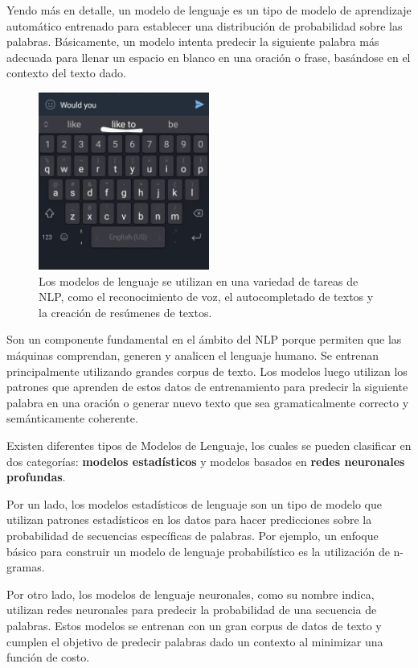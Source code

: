 Yendo más en detalle, un modelo de lenguaje es un tipo de modelo de aprendizaje automático entrenado para establecer una distribución de probabilidad sobre las palabras. Básicamente, un modelo intenta predecir la siguiente palabra más adecuada para llenar un espacio en blanco en una oración o frase, basándose en el contexto del texto dado.

\begin{figure}[H]
    \centering
    \includegraphics[width=0.5\textwidth]{imagenes/autocompletado_celular.jpg}
    \caption{Los modelos de lenguaje se utilizan en una variedad de tareas de NLP, como el reconocimiento de voz, el autocompletado de textos y la creación de resúmenes de textos.}
    \label{fig:nlp}
\end{figure}

Son un componente fundamental en el ámbito del NLP porque permiten que las máquinas comprendan, generen y analicen el lenguaje humano. Se entrenan principalmente utilizando grandes corpus de texto. Los modelos luego utilizan los patrones que aprenden de estos datos de entrenamiento para predecir la siguiente palabra en una oración o generar nuevo texto que sea gramaticalmente correcto y semánticamente coherente.

Existen diferentes tipos de Modelos de Lenguaje, los cuales se pueden clasificar en dos categorías: \textbf{modelos estadísticos} y modelos basados en \textbf{redes neuronales profundas}.

Por un lado, los modelos estadísticos de lenguaje son un tipo de modelo que utilizan patrones estadísticos en los datos para hacer predicciones sobre la probabilidad de secuencias específicas de palabras. Por ejemplo, un enfoque básico para construir un modelo de lenguaje probabilístico es la utilización de n-gramas.

Por otro lado, los modelos de lenguaje neuronales, como su nombre indica, utilizan redes neuronales para predecir la probabilidad de una secuencia de palabras. Estos modelos se entrenan con un gran corpus de datos de texto y cumplen el objetivo de predecir palabras dado un contexto al minimizar una función de costo.

